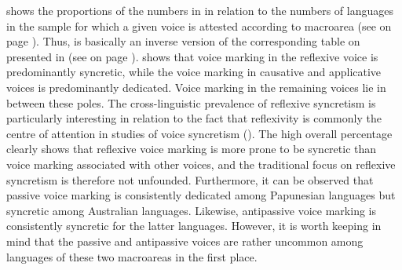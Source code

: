  shows the proportions of the numbers in  in relation to the numbers of languages in the sample for which a given voice is attested according to macroarea (see  on page \pageref{tab:ch6:voice-frequency}). Thus,  is basically an inverse version of the corresponding table on  presented in  (see  on page \pageref{tab:ch6:voice-dedicated-2}).  shows that voice marking in the reflexive voice is predominantly syncretic, while the voice marking in causative and applicative voices is predominantly dedicated. Voice marking in the remaining voices lie in between these poles. The cross-linguistic prevalence of reflexive syncretism is particularly interesting in relation to the fact that reflexivity is commonly the centre of attention in studies of voice syncretism (). The high overall percentage clearly shows that reflexive voice marking is more prone to be syncretic than voice marking associated with other voices, and the traditional focus on reflexive syncretism is therefore not unfounded. Furthermore, it can be observed that passive voice marking is consistently dedicated among Papunesian languages but syncretic among Australian languages. Likewise, antipassive voice marking is consistently syncretic for the latter languages. However, it is worth keeping in mind that the passive and antipassive voices are rather uncommon among languages of these two macroareas in the first place. 

